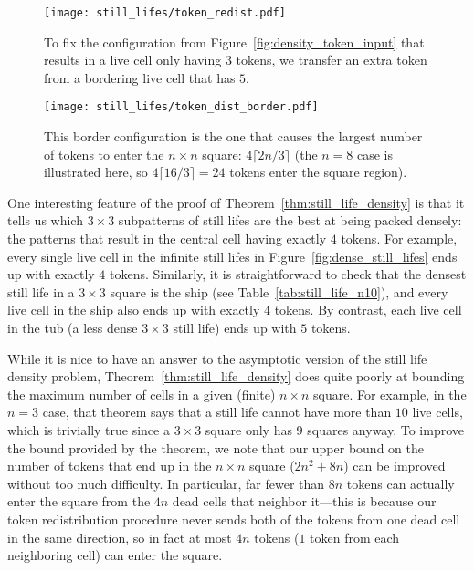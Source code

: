 \begin{figure}[!htb]
	\centering
	\begin{minipage}[b]{0.46\textwidth}
		\centering
		\texttt{[image: still\_lifes/token\_redist.pdf]}
		\caption{To fix the configuration from Figure~\ref{fig:density_token_input} that results in a live cell only having $3$ tokens, we transfer an extra token from a bordering live cell that has $5$.}\label{fig:density_token_input_fix}
	\end{minipage}\hfill
	\begin{minipage}[b]{0.51\textwidth}
		\centering
		\texttt{[image: still\_lifes/token\_dist\_border.pdf]}
		\caption{This border configuration is the one that causes the largest number of tokens to enter the $n \times n$ square: $4\lceil 2n/3\rceil$ (the $n = 8$ case is illustrated here, so $4\lceil 16/3 \rceil = 24$ tokens enter the square region).}\label{fig:density_border_improve}
	\end{minipage}
\end{figure}

One interesting feature of the proof of Theorem~\ref{thm:still_life_density} is that it tells us which $3 \times 3$ subpatterns of still lifes are the best at being packed densely: the patterns that result in the central cell having exactly $4$ tokens. For example, every single live cell in the infinite still lifes in Figure~\ref{fig:dense_still_lifes} ends up with exactly $4$ tokens. Similarly, it is straightforward to check that the densest still life in a $3 \times 3$ square is the ship (see Table~\ref{tab:still_life_n10}), and every live cell in the ship also ends up with exactly $4$ tokens. By contrast, each live cell in the tub (a less dense $3 \times 3$ still life) ends up with $5$ tokens.

While it is nice to have an answer to the asymptotic version of the still life density problem, Theorem~\ref{thm:still_life_density} does quite poorly at bounding the maximum number of cells in a given (finite) $n \times n$ square. For example, in the $n = 3$ case, that theorem says that a still life cannot have more than $10$ live cells, which is trivially true since a $3 \times 3$ square only has $9$ squares anyway. To improve the bound provided by the theorem, we note that our upper bound on the number of tokens that end up in the $n \times n$ square ($2n^2 + 8n$) can be improved without too much difficulty. In particular, far fewer than $8n$ tokens can actually enter the square from the $4n$ dead cells that neighbor it---this is because our token redistribution procedure never sends both of the tokens from one dead cell in the same direction, so in fact at most $4n$ tokens ($1$ token from each neighboring cell) can enter the square.

